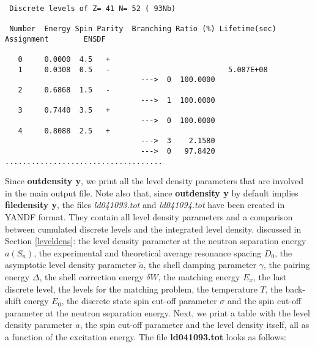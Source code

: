 \begin{samplecase}
{\small \begin{verbatim}

 Discrete levels of Z= 41 N= 52 ( 93Nb)

 Number  Energy Spin Parity  Branching Ratio (%) Lifetime(sec) Assignment        ENSDF

   0     0.0000  4.5   +                                                 
   1     0.0308  0.5   -                           5.087E+08            
                               --->  0  100.0000
   2     0.6868  1.5   -                                    
                               --->  1  100.0000
   3     0.7440  3.5   +                                   
                               --->  0  100.0000
   4     0.8088  2.5   +                                  
                               --->  3    2.1580
                               --->  0   97.8420
....................................
\end{verbatim} } \renewcommand{\baselinestretch}{1.07}\small\normalsize
\noindent
Since {\bf outdensity y}, we print all the level density parameters that are 
involved in the main output file.
Note also that, since {\bf outdensity y} by default implies {\bf filedensity y},
the files {\it ld041093.tot} and  {\it ld041094.tot} have been created in YANDF format. They
contain all level density parameters and a comparison between cumulated 
discrete levels and the integrated level density.
discussed in Section \ref{leveldens}: the level density parameter at the 
neutron separation energy $a(S_{n})$, the experimental and theoretical average 
resonance spacing $D_{0}$, the asymptotic level density parameter 
$\tilde{a}$, the shell damping parameter $\gamma$, the pairing energy $\Delta$, 
the shell correction energy $\delta W$, the matching energy $E_{x}$, the last 
discrete level, the levels for the matching problem, the temperature $T$, the 
back-shift energy $E_{0}$, the discrete state spin cut-off parameter 
$\sigma$ and the spin cut-off parameter at the neutron separation energy.
Next, we print a table with the level density parameter $a$, the spin cut-off 
parameter and the level density itself, all as a function of the excitation 
energy. The file {\bf ld041093.tot} looks as follows:

{\small \begin{verbatim}


\end{verbatim}}
\end{samplecase}
